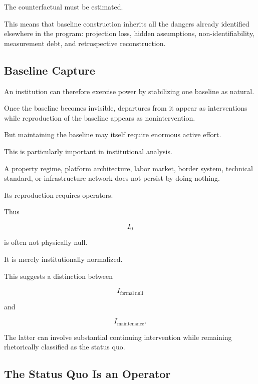 \documentclass[11pt]{article}
\theoremstyle{remark}
\begin{document}
The counterfactual must be estimated.

This means that baseline construction inherits all the dangers already identified elsewhere in the program: projection loss, hidden assumptions, non-identifiability, measurement debt, and retrospective reconstruction.

\subsection{Baseline Capture}

An institution can therefore exercise power by stabilizing one baseline as natural.

Once the baseline becomes invisible, departures from it appear as interventions while reproduction of the baseline appears as nonintervention.

But maintaining the baseline may itself require enormous active effort.

This is particularly important in institutional analysis.

A property regime, platform architecture, labor market, border system, technical standard, or infrastructure network does not persist by doing nothing.

Its reproduction requires operators.

Thus

\begin{equation}
I_0
\end{equation}

is often not physically null.

It is merely institutionally normalized.

This suggests a distinction between

\begin{equation}
I_{\mathrm{formal\ null}}
\end{equation}

and

\begin{equation}
I_{\mathrm{maintenance}}.
\end{equation}

The latter can involve substantial continuing intervention while remaining rhetorically classified as the status quo.

\subsection{The Status Quo Is an Operator}
\end{document}
